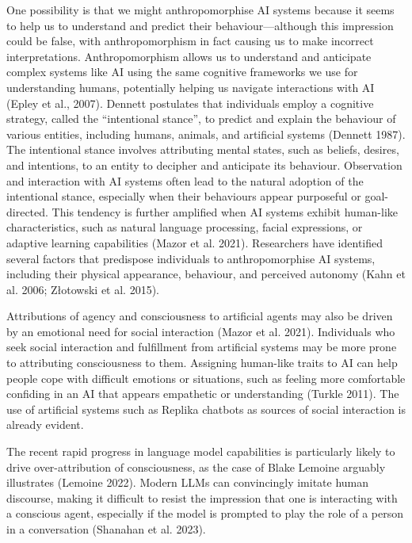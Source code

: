 \documentclass[12pt]{article}
\begin{document}
One possibility is that we might anthropomorphise AI systems because it seems to help us to understand and predict their behaviour—although this impression could be false, with anthropomorphism in fact causing us to make incorrect interpretations. Anthropomorphism allows us to understand and anticipate complex systems like AI using the same cognitive frameworks we use for understanding humans, potentially helping us navigate interactions with AI (Epley et al., 2007). Dennett postulates that individuals employ a cognitive strategy, called the ``intentional stance'', to predict and explain the behaviour of various entities, including humans, animals, and artificial systems (Dennett 1987). The intentional stance involves attributing mental states, such as beliefs, desires, and intentions, to an entity to decipher and anticipate its behaviour. Observation and interaction with AI systems often lead to the natural adoption of the intentional stance, especially when their behaviours appear purposeful or goal-directed. This tendency is further amplified when AI systems exhibit human-like characteristics, such as natural language processing, facial expressions, or adaptive learning capabilities (Mazor et al. 2021). Researchers have identified several factors that predispose individuals to anthropomorphise AI systems, including their physical appearance, behaviour, and perceived autonomy (Kahn et al. 2006; Złotowski et al. 2015).

Attributions of agency and consciousness to artificial agents may also be driven by an emotional need for social interaction (Mazor et al. 2021). Individuals who seek social interaction and fulfillment from artificial systems may be more prone to attributing consciousness to them. Assigning human-like traits to AI can help people cope with difficult emotions or situations, such as feeling more comfortable confiding in an AI that appears empathetic or understanding (Turkle 2011). The use of artificial systems such as Replika chatbots as sources of social interaction is already evident.

The recent rapid progress in language model capabilities is particularly likely to drive over-attribution of consciousness, as the case of Blake Lemoine arguably illustrates (Lemoine 2022). Modern LLMs can convincingly imitate human discourse, making it difficult to resist the impression that one is interacting with a conscious agent, especially if the model is prompted to play the role of a person in a conversation (Shanahan et al. 2023).
\end{document}
